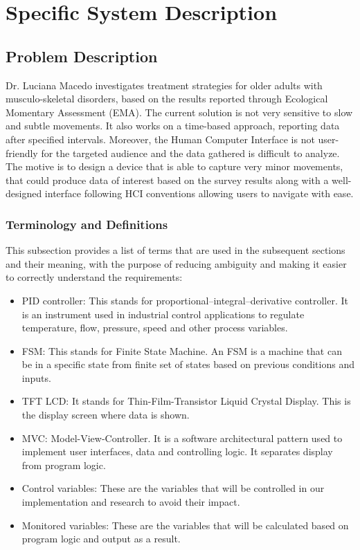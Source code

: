 \documentclass[12pt]{article}
\begin{document}
\section{Specific System Description}
\label{SSD}
\subsection{Problem Description} \label{Sec_pd}

Dr. Luciana Macedo investigates treatment strategies for older adults with musculo-skeletal disorders, based on the results reported through Ecological Momentary Assessment (EMA).
The current solution is not very sensitive to slow and subtle movements. It also works on a time-based approach, reporting data after specified intervals. Moreover, the Human Computer Interface is not user-friendly for the targeted audience and the data gathered is difficult to analyze.
The motive is to design a device that is able to capture very minor movements, that could produce data of interest based on the survey results along with a well-designed interface following HCI conventions allowing users to navigate with ease.

\subsubsection{Terminology and  Definitions}

This subsection provides a list of terms that are used in the subsequent
sections and their meaning, with the purpose of reducing ambiguity and making it
easier to correctly understand the requirements:

\begin{itemize}

  \item PID controller: This stands for proportional–integral–derivative controller. It is an instrument used in industrial control applications to regulate temperature, flow, pressure, speed and other process variables.
  \item FSM: This stands for Finite State Machine. An FSM is a machine that can be in a specific state from finite set of states based on previous conditions and inputs.
  \item TFT LCD: It stands for Thin-Film-Transistor Liquid Crystal Display. This is the display screen where data is shown.
  \item MVC: Model-View-Controller. It is a software architectural pattern used to implement user interfaces, data and controlling logic. It separates display from program logic.
  \item Control variables: These are the variables that will be controlled in our implementation and research to avoid their impact.
  \item Monitored variables: These are the variables that will be calculated based on program logic and output as a result.

\end{itemize}
\end{document}
